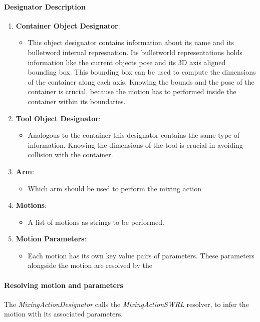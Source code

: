 \paragraph{Designator Description}
\begin{enumerate}
    \item \textbf{Container Object Designator}:
    \begin{itemize}
        \item This object designator contains information about its name and its bulletword internal represnation.
            Its bulletworld representations holds information like the current objects pose and its 3D axis aligned bounding box.
            This bounding box can be used to compute the dimensions of the container along each axis. 
            Knowing the bounds and the pose of the container is crucial, because the motion has to performed inside 
            the container within its boundaries.
    \end{itemize}
    \item \textbf{Tool Object Designator}:
    \begin{itemize}
        \item Analogous to the container this designator contains the same type of information.
        Knowing the dimensions of the tool is crucial in avoiding collision with the container.
    \end{itemize}
    \item \textbf{Arm}:
    \begin{itemize}
        \item Which arm should be used to perform the mixing action
    \end{itemize}
    \item \textbf{Motions}:
    \begin{itemize}
        \item A list of motions as strings to be performed. 
    \end{itemize}
    \item \textbf{Motion Parameters}:
    \begin{itemize}
        \item Each motion has its own key value pairs of parameters.
        These parameters alongside the motion are resolved by the 
    \end{itemize}
\end{enumerate}

\paragraph*{Resolving motion and parameters}
The \textit{MixingActionDesignator} calls the \textit{MixingActionSWRL} resolver, to infer the motion with its 
associated parameters. 

